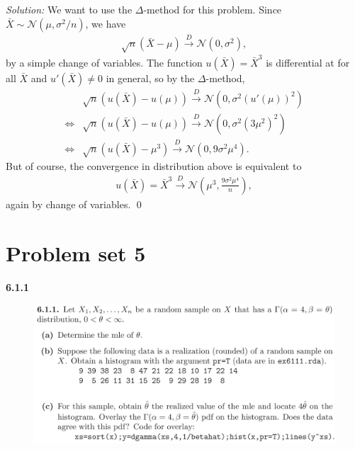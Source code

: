 \documentclass{book}
\theoremstyle{definition}
\newcommand{\nn}{\nonumber}
\newcommand{\N}{\mathcal{N}}
\newcommand{\f}[2]{\frac{#1}{#2}}
\newcommand{\lp}{\left(}
\newcommand{\rp}{\right)}
\begin{document}
\noindent \textit{Solution:} We want to use the $\Delta$-method for this problem. Since $\bar{X} \sim \N(\mu, \sigma^2/n)$, we have
\begin{align}
\sqrt{n}(\bar{X} - \mu) \xrightarrow{D} \N(0,\sigma^2),
\end{align}
by a simple change of variables. The function $u(\bar{X}) = \bar{X}^3$ is differential at for all $\bar{X}$ and $u'(\bar{X}) \neq 0$ in general, so by the $\Delta$-method,
\begin{align}
&\sqrt{n}(u(\bar{X}) - u(\mu)) \xrightarrow{D} \N(0, \sigma^2(u'(\mu))^2)\nn\\
\iff &\sqrt{n}(u(\bar{X}) - u(\mu)) \xrightarrow{D} \N(0, \sigma^2(3\mu^2)^2)\nn\\
\iff &\sqrt{n}(u(\bar{X}) - \mu^3) \xrightarrow{D} \N(0, 9\sigma^2\mu^4).
\end{align}
\noindent But of course, the convergence in distribution above is equivalent to 
\begin{align}
u(\bar{X}) = \bar{X}^3 \xrightarrow{D} \N\lp\mu^3, \f{9\sigma^2\mu^4}{n} \rp,
\end{align}
again by change of variables. \qed




\newpage




\section{Problem set 5}


\noindent \textbf{6.1.1}
\begin{figure}[!htb]
	\centering
	\includegraphics[scale=0.25]{611}
\end{figure}
 
 
 
\end{document}
